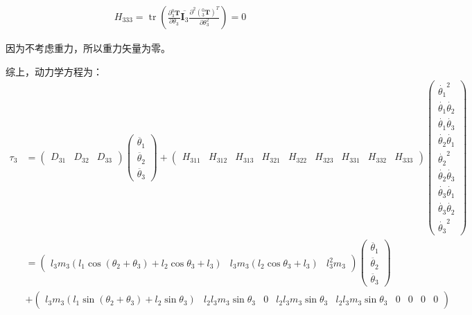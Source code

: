 \documentclass{homework}
\begin{document}
\begin{sol}
\begin{align*}
  H_{333} = \operatorname{tr} (\frac{\partial {^0_3}\mathbf{T}}{\partial \theta_3} \overline{\mathbf{I}_3} \frac{\partial^2 ({^0_3}\mathbf{T})^T}{\partial \theta_3^2}) 
          = 0
\end{align*}

因为不考虑重力，所以重力矢量为零。

综上，动力学方程为：
\begin{align*}
  \tau_3 
  &=
  \begin{pmatrix}
    D_{31} & D_{32} & D_{33}
  \end{pmatrix}
  \begin{pmatrix}
    \ddot{\theta_1} \\
    \ddot{\theta_2} \\
    \ddot{\theta_3} 
  \end{pmatrix} +
  \begin{pmatrix}
    H_{311} & H_{312} & H_{313} & H_{321} & H_{322} & H_{323} & H_{331} & H_{332} & H_{333}  
  \end{pmatrix}
  \begin{pmatrix}
    \dot{\theta_1}^2 \\
    \dot{\theta_1} \dot{\theta_2} \\
    \dot{\theta_1} \dot{\theta_3} \\
    \dot{\theta_2} \dot{\theta_1} \\
    \dot{\theta_2}^2 \\
    \dot{\theta_2} \dot{\theta_3} \\
    \dot{\theta_3} \dot{\theta_1} \\
    \dot{\theta_3} \dot{\theta_2} \\
    \dot{\theta_3}^2
  \end{pmatrix} \\
  &=
  \begin{pmatrix}
    l_3 m_3 (l_1 \cos(\theta_2 + \theta_3) + l_2 \cos\theta_3 + l_3) & l_3 m_3 (l_2 \cos\theta_3 + l_3) & l_3^2 m_3
  \end{pmatrix}
  \begin{pmatrix}
    \ddot{\theta_1} \\
    \ddot{\theta_2} \\
    \ddot{\theta_3} 
  \end{pmatrix} \\
  &+
  \begin{pmatrix}
    l_3 m_3 (l_1 \sin(\theta_2 + \theta_3) + l_2 \sin\theta_3) & l_2 l_3 m_3 \sin\theta_3 & 0 & l_2 l_3 m_3 \sin\theta_3 & l_2 l_3 m_3 \sin\theta_3 & 0 & 0 & 0 & 0  

\end{pmatrix}
\end{align*}
\end{sol}
\end{document}
